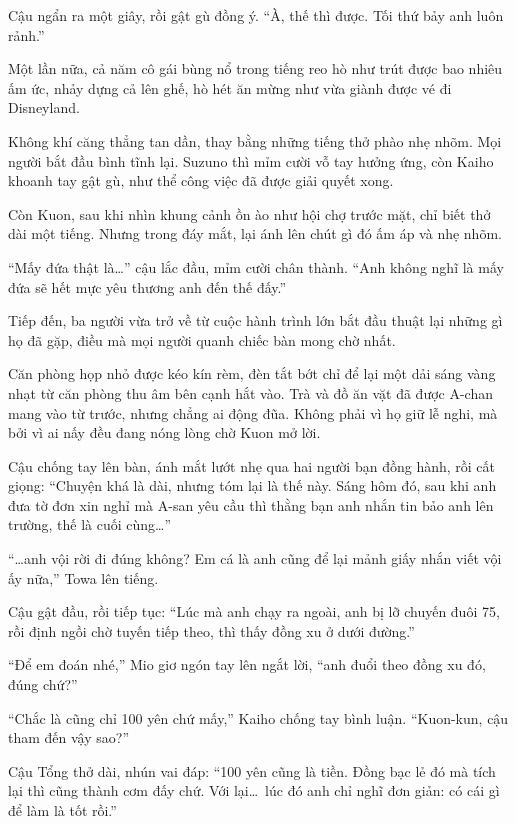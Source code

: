 \documentclass[../main.tex]{subfiles}
\begin{document}
Cậu ngẩn ra một giây, rồi gật gù đồng ý. ``À, thế thì được. Tối thứ bảy anh luôn rảnh.''

Một lần nữa, cả năm cô gái bùng nổ trong tiếng reo hò như trút được bao nhiêu ấm ức, nhảy dựng cả lên ghế, hò hét ăn mừng như vừa giành được vé đi Disneyland.

Không khí căng thẳng tan dần, thay bằng những tiếng thở phào nhẹ nhõm. Mọi người bắt đầu bình tĩnh lại. Suzuno thì mỉm cười vỗ tay hưởng ứng, còn Kaiho khoanh tay gật gù, như thể công việc đã được giải quyết xong.

Còn Kuon, sau khi nhìn khung cảnh ồn ào như hội chợ trước mặt, chỉ biết thở dài một tiếng. Nhưng trong đáy mắt, lại ánh lên chút gì đó ấm áp và nhẹ nhõm.

``Mấy đứa thật là\dots'' cậu lắc đầu, mỉm cười chân thành. ``Anh không nghĩ là mấy đứa sẽ hết mực yêu thương anh đến thế đấy.''

\ct

Tiếp đến, ba người vừa trở về từ cuộc hành trình lớn bắt đầu thuật lại những gì họ đã gặp, điều mà mọi người quanh chiếc bàn mong chờ nhất.

Căn phòng họp nhỏ được kéo kín rèm, đèn tắt bớt chỉ để lại một dải sáng vàng nhạt từ căn phòng thu âm bên cạnh hắt vào. Trà và đồ ăn vặt đã được A-chan mang vào từ trước, nhưng chẳng ai động đũa. Không phải vì họ giữ lễ nghi, mà bởi vì ai nấy đều đang nóng lòng chờ Kuon mở lời.

Cậu chống tay lên bàn, ánh mắt lướt nhẹ qua hai người bạn đồng hành, rồi cất giọng: ``Chuyện khá là dài, nhưng tóm lại là thế này. Sáng hôm đó, sau khi anh đưa tờ đơn xin nghỉ mà A-san yêu cầu thì thằng bạn anh nhắn tin bảo anh lên trường, thế là cuối cùng\dots''

``\dots anh vội rời đi đúng không? Em cá là anh cũng để lại mảnh giấy nhắn viết vội ấy nữa,'' Towa lên tiếng.

Cậu gật đầu, rồi tiếp tục: ``Lúc mà anh chạy ra ngoài, anh bị lỡ chuyến đuôi 75, rồi định ngồi chờ tuyến tiếp theo, thì thấy đồng xu ở dưới đường.''

``Để em đoán nhé,'' Mio giơ ngón tay lên ngắt lời, ``anh đuổi theo đồng xu đó, đúng chứ?''

``Chắc là cũng chỉ 100 yên chứ mấy,'' Kaiho chống tay bình luận. ``Kuon-kun, cậu tham đến vậy sao?''

Cậu Tổng thở dài, nhún vai đáp: ``100 yên cũng là tiền. Đồng bạc lẻ đó mà tích lại thì cũng thành cơm đấy chứ. Với lại\dots\ lúc đó anh chỉ nghĩ đơn giản: có cái gì để làm là tốt rồi.''
\end{document}
